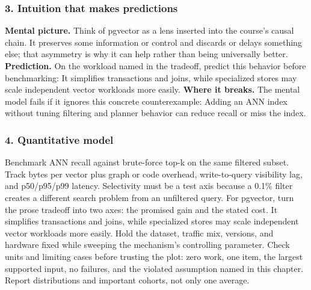\subsubsection*{3. Intuition that makes predictions}
\textbf{Mental picture.} Think of pgvector as a lens inserted into the course's causal chain. It preserves some information or control and discards or delays something else; that asymmetry is why it can help rather than being universally better.
\textbf{Prediction.} On the workload named in the tradeoff, predict this behavior before benchmarking: It simplifies transactions and joins, while specialized stores may scale independent vector workloads more easily.
\textbf{Where it breaks.} The mental model fails if it ignores this concrete counterexample: Adding an ANN index without tuning filtering and planner behavior can reduce recall or miss the index.
\subsubsection*{4. Quantitative model}
Benchmark ANN recall against brute-force top-k on the same filtered subset. Track bytes per vector plus graph or code overhead, write-to-query visibility lag, and p50/p95/p99 latency. Selectivity must be a test axis because a 0.1\% filter creates a different search problem from an unfiltered query.
For pgvector, turn the prose tradeoff into two axes: the promised gain and the stated cost. It simplifies transactions and joins, while specialized stores may scale independent vector workloads more easily. Hold the dataset, traffic mix, versions, and hardware fixed while sweeping the mechanism's controlling parameter.
Check units and limiting cases before trusting the plot: zero work, one item, the largest supported input, no failures, and the violated assumption named in this chapter. Report distributions and important cohorts, not only one average.
